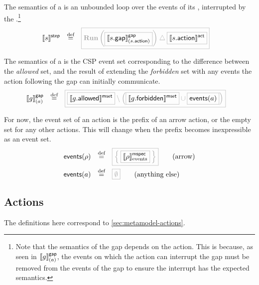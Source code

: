 \begin{defn}[\msequencestep]

The semantics of a \msequencestep{} is an unbounded loop over the events of its
\msequencegap, interrupted by the \msequenceaction.\footnote{Note that the semantics of the gap depends
on the action.  This is because, as seen in \(\llbracket g \rrbracket^{\mathsf{gap}}_{(a)}\),
the events on which the action can interrupt the
gap must be removed from the events of the gap to ensure the interrupt has the
expected semantics.}
%
\begin{align*}
	\stepsema{\astep}
\quad\defeq\quad&	
	\tlang{
		\runproc{\olang{\gapsema{\field{\astep}{gap}}{\field{\astep}{action}}}}
		\interrupt \olang{\actsema{\field{\astep}{action}}}
	}
\end{align*}
\end{defn}

\begin{defn}[\msequencegap]
	The semantics of a \msequencegap{} is the CSP event set corresponding to
	the difference between the \emph{allowed} set,
	and the result of extending the \emph{forbidden} set with any events
	the action following the gap can initially communicate.
%
\begin{align*}
	\gapsema{
		\agap
	}{\anaction}
\quad\defeq\quad&
\tlang{
	\olang{\msgsetsema{\field{\agap}{allowed}}}
	\setminus
	\left(
		\olang{\msgsetsema{\field{\agap}{forbidden}}}
		\cup
		\olang{\eventsOf{\anaction}}
	\right)
}
\end{align*}
\end{defn}

\begin{defn}
For now, the event set of an action is the prefix of an arrow action, or
the empty set for any other actions.  This will change when the prefix becomes
inexpressible as an event set.
%
\begin{align*}
	\eventsOf{\anarrow}
\quad\defeq\quad&
	\tlang{\Set{\olang{\emspecsema{\anarrow}}}}
	\tag{arrow}
\\
	\eventsOf{\anaction}
\quad\defeq\quad&
	\tlang{\emptyset}
	\tag{anything else}
\end{align*}
\end{defn}

\subsection{Actions}\label{ssec:semantics-tockcsp-actions}

The definitions here correspond to \cref{sec:metamodel-actions}.

